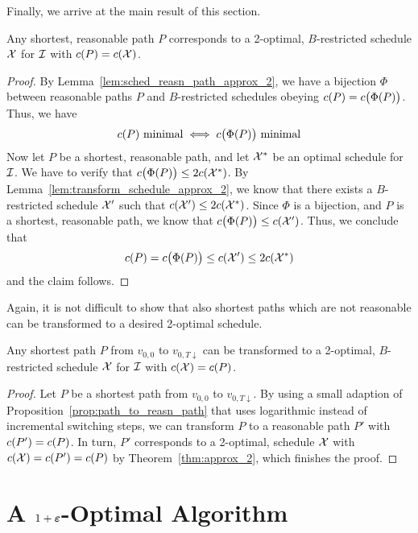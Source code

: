 Finally, we arrive at the main result of this section.
\begin{thm}\label{thm:approx_2}
Any shortest, reasonable path $P$ corresponds to a 2-optimal, $B$-restricted schedule $\mathcal{X}$ for $\mathcal{I}$ with $c(P)=c(\mathcal{X})$.
\end{thm} 
\begin{proof}
By Lemma~\ref{lem:sched_reasn_path_approx_2}, we have a bijection $\Phi$ between reasonable paths $P$ and $B$-restricted schedules obeying $c(P)=c\bigl(\Phi(P)\bigr)$. Thus, we have 
\begin{equation*}
	c(P)\text{ minimal}\iff c\bigl(\Phi(P)\big)\text{ minimal}
\end{equation*}
Now let $P$ be a shortest, reasonable path, and let $\mathcal{X}^*$ be an optimal schedule for $\mathcal{I}$. We have to verify that $c\bigl(\Phi(P)\bigr)\le 2c(\mathcal{X}^*)$. By Lemma~\ref{lem:transform_schedule_approx_2}, we know that there exists a $B$-restricted schedule $\mathcal{X}'$ such that $c(\mathcal{X}')\le 2c(\mathcal{X}^*)$. Since $\Phi$ is a bijection, and $P$ is a shortest, reasonable path, we know that $c\bigl(\Phi(P)\bigr)\le c(\mathcal{X}')$. Thus, we conclude that 
\begin{equation*}
	c(P)=c\bigl(\Phi(P)\bigr)\le c(\mathcal{X}')\le 2c(\mathcal{X}^*)
\end{equation*}
and the claim follows.
\end{proof}
Again, it is not difficult to show that also shortest paths which are not reasonable can be transformed to a desired 2-optimal schedule.
\begin{cor}\label{cor:opt_sched_short_path_pseudo_lin}
Any shortest path $P$ from $v_{0,0}$ to $v_{0,T\downarrow}$ can be transformed to a 2-optimal, $B$-restricted schedule $\mathcal{X}$ for $\mathcal{I}$ with $c(\mathcal{X})=c(P)$.
\end{cor}
\begin{proof}
Let $P$ be a shortest path from $v_{0,0}$ to $v_{0,T\downarrow}$. By using a small adaption of Proposition~\ref{prop:path_to_reasn_path} that uses logarithmic instead of incremental switching steps, we can transform $P$ to a reasonable path $P'$ with $c(P')=c(P)$.
In turn, $P'$ corresponds to a 2-optimal,  schedule $\mathcal{X}$ with $c(\mathcal{X})=c(P')=c(P)$ by Theorem~\ref{thm:approx_2}, which finishes the proof.
\end{proof}


\section{A $1+\boldsymbol\varepsilon$-Optimal Algorithm}
